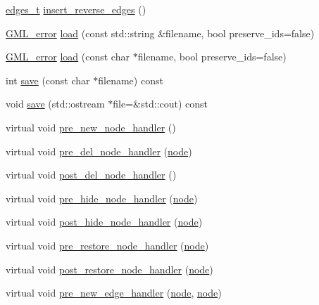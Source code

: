 \begin{DoxyCompactItemize}
\item 
\mbox{\hyperlink{edge_8h_a8f9587479bda6cf612c103494b3858e3}{edges\+\_\+t}} \mbox{\hyperlink{classgraph_a1085478258cf370dcfbe283e834df339}{insert\+\_\+reverse\+\_\+edges}} ()
\item 
\mbox{\hyperlink{struct_g_m_l__error}{G\+M\+L\+\_\+error}} \mbox{\hyperlink{classgraph_ac28cb3468623a480709d3329033d4ec8}{load}} (const std\+::string \&filename, bool preserve\+\_\+ids=false)
\item 
\mbox{\hyperlink{struct_g_m_l__error}{G\+M\+L\+\_\+error}} \mbox{\hyperlink{classgraph_a37c17685e1becc66723699d4c9db072b}{load}} (const char $\ast$filename, bool preserve\+\_\+ids=false)
\item 
int \mbox{\hyperlink{classgraph_a7bd0712a528249d1585085a64ac3e661}{save}} (const char $\ast$filename) const
\item 
void \mbox{\hyperlink{classgraph_ad53bd0f3c96616b7f2d44abdce3df6de}{save}} (std\+::ostream $\ast$file=\&std\+::cout) const
\item 
virtual void \mbox{\hyperlink{classgraph_afb7606eaa8d673b6599af24437c0546c}{pre\+\_\+new\+\_\+node\+\_\+handler}} ()
\item 
virtual void \mbox{\hyperlink{classgraph_a64699c6cb14cdedab5e13232a8f3e754}{pre\+\_\+del\+\_\+node\+\_\+handler}} (\mbox{\hyperlink{classnode}{node}})
\item 
virtual void \mbox{\hyperlink{classgraph_a4e08a559e3f1007a1a16a53c9a15cb0f}{post\+\_\+del\+\_\+node\+\_\+handler}} ()
\item 
virtual void \mbox{\hyperlink{classgraph_ac169b1dca0b01c97e683302b3908fd49}{pre\+\_\+hide\+\_\+node\+\_\+handler}} (\mbox{\hyperlink{classnode}{node}})
\item 
virtual void \mbox{\hyperlink{classgraph_a50cb72a1e81d0a3d68965a1e6070edb3}{post\+\_\+hide\+\_\+node\+\_\+handler}} (\mbox{\hyperlink{classnode}{node}})
\item 
virtual void \mbox{\hyperlink{classgraph_a3a305d240ab5237a2adae315b50105a6}{pre\+\_\+restore\+\_\+node\+\_\+handler}} (\mbox{\hyperlink{classnode}{node}})
\item 
virtual void \mbox{\hyperlink{classgraph_a2d555506de6aa30bb981f0b60375762d}{post\+\_\+restore\+\_\+node\+\_\+handler}} (\mbox{\hyperlink{classnode}{node}})
\item 
virtual void \mbox{\hyperlink{classgraph_a0a7a68fa0baa47ef955525c445fa1a04}{pre\+\_\+new\+\_\+edge\+\_\+handler}} (\mbox{\hyperlink{classnode}{node}}, \mbox{\hyperlink{classnode}{node}})
\item 

\end{DoxyCompactItemize}
